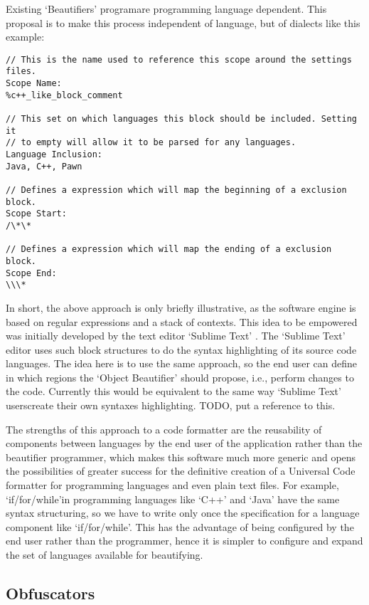 Existing `Beautifiers' program\s are programming language dependent.
This proposal is to make this process independent of language,
but of dialects like this example:

\begin{lstlisting}
// This is the name used to reference this scope around the settings files.
Scope Name:
%c++_like_block_comment

// This set on which languages this block should be included. Setting it
// to empty will allow it to be parsed for any languages.
Language Inclusion:
Java, C++, Pawn

// Defines a expression which will map the beginning of a exclusion block.
Scope Start:
/\*\*

// Defines a expression which will map the ending of a exclusion block.
Scope End:
\\\*
\end{lstlisting}
\vspace*{-4mm}

In short,
the above approach is only briefly illustrative,
as the software engine is based on regular expressions and a stack of contexts.
This idea to be empowered was initially developed by the text editor `Sublime Text' \cite{Skinner}.
The `Sublime Text' editor uses such block structures to do the syntax highlighting of its source code languages.
The idea here is to use the same approach,
so the end user can define in which regions the `Object Beautifier' should propose, i.e.,
perform changes to the code.
Currently this would be equivalent to the same way `Sublime Text' users\q create their own syntaxes highlighting.
TODO,
put a reference to this.

The strengths of this approach to a code formatter are the reusability of components between languages by the end
user of the application rather than the beautifier programmer,
which makes this software much more generic and opens the possibilities of greater success for the definitive
creation of a Universal Code formatter for programming languages and even plain text files.
For example,
`if/for/while'\q in programming languages like `C++' and `Java' have the same syntax structuring,
so we have to write only once the specification for a language component like `if/for/while'\q.
This has the advantage of being configured by the end user rather than the programmer,
hence it is simpler to configure and expand the set of languages available for beautifying.


\subsection{Obfuscators}

